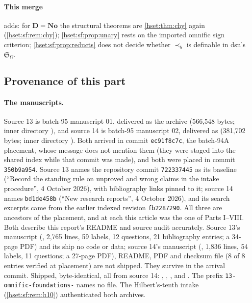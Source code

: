 \documentclass[11pt,letterpaper]{article}
\theoremstyle{definition}
\theoremstyle{remark}
\newcommand{\No}{\mathbf{No}}
\newcommand{\precb}{\prec_b}
\newcommand{\Dd}{\mathbf{D}}
\begin{document}
\paragraph{This merge} adds: for $\Dd=\No$ the structural theorems are
\cref{hset:thm:chy} again (\cref{hset:sf:rem:chy}); \cref{hset:sf:prop:unary} rests on
the imported omnific sign criterion; \cref{hset:sf:prop:reducts} does not decide
whether $\precb$ is definable in dsn's $\mathfrak S_\Omega$.

\subsection{Provenance of this part}
\label{hset:sf:sub:provenance}

\paragraph{The manuscripts.} Source 13 is batch-95 manuscript 01, delivered as the
archive  (566,548 bytes; inner directory
), and source 14 is batch-95 manuscript 02,
delivered as  (381,702 bytes; inner
directory ). Both arrived in commit
\texttt{ec91f8c7c}, the batch-94A placement, whose message does not mention them
(they were staged into the shared index while that commit was made), and both were
placed in commit \texttt{350b9a954}. Source 13 names the repository commit
\texttt{722337445} as its baseline (``Record the standing rule on unproved and wrong
claims in the intake procedure'', 4 October 2026), with bibliography links pinned to
it; source 14 names \texttt{bd1de458b} (``New research reports'', 4 October 2026),
and its search excerpts came from the earlier indexed revision \texttt{fb2287290}.
All three are ancestors of the placement, and at each this article was the one of
Parts I--VIII. Both describe this report's README and source audit accurately.
Source 13's manuscript (, 2,765 lines, 59
labels, 12 questions, 21 bibliography entries; a 34-page PDF) and its
 ship no code or data; source 14's manuscript (,
1,836 lines, 54 labels, 11 questions; a 27-page PDF), README, PDF and checksum file
 (8 of 8 entries verified at placement) are not shipped. They
survive in the arrival commit. Shipped, byte-identical, all from source 14:
,
,
,
 and
. The prefix
\texttt{13-omnific-foundations-} names no file. The Hilbert's-tenth intake
(\cref{hset:sf:rem:h10}) authenticated both archives.
\end{document}
